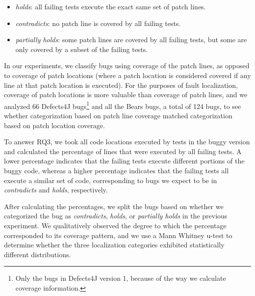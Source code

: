 \documentclass[10pt, conference]{IEEEtran}
\begin{document}
\begin{itemize}
\item \emph{holds}:  all failing tests execute the exact same set of patch lines.
\item \emph{contradicts}: no patch line is covered by all failing tests.
\item \emph{partially holds}: some patch lines are covered by all failing tests, but some are only 
covered by a subset of the failing tests.
\end{itemize}

In our experiments, we classify bugs using coverage of the patch lines, as opposed to 
coverage of 
patch locations (where a patch location is considered covered if any line at that patch location 
is 
executed). For the purposes of fault localization, coverage of patch locations is more valuable 
than coverage of patch lines, and we analyzed 66 Defects4J bugs\footnote{Only the 
bugs in Defects4J version 1, because of the way we calculate coverage information.}
 and all the Bears bugs, a total of 124 bugs, to see whether categorization 
based on patch line 
coverage matched categorization based on patch location coverage.

To answer RQ3, we took all code locations executed by tests in the buggy version and
calculated the percentage of lines that were executed by all failing tests. 
A lower percentage indicates that the failing tests execute different portions of the buggy 
code, whereas a higher percentage indicates that the failing tests all execute a similar
set of code, corresponding to bugs we expect to be in \emph{contradicts} and \emph{holds},
respectively.

After calculating the percentages, we split the bugs based on whether we categorized the bug 
as \emph{contradicts}, \emph{holds}, or \emph{partially holds} in the previous experiment.
We qualitatively observed the degree to which the percentage corresponded to its coverage 
pattern, and we use a Mann Whitney u-test to determine whether the three localization 
categories exhibited statistically different distributions.
\end{document}
